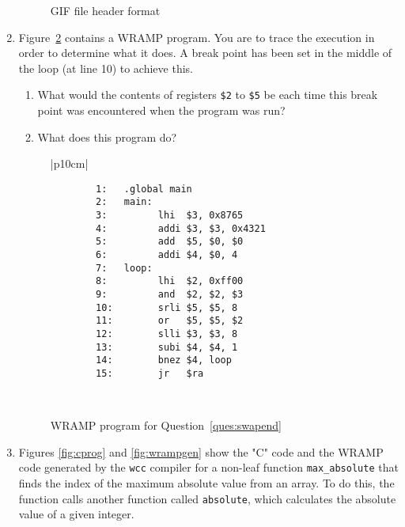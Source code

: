 \documentclass[a4paper,10pt]{article}
\begin{document}
\begin{enumerate}
\begin{figure}[h]
  \begin{center}
  \caption{GIF file header format}
  \label{fig:gifheader}
  \end{center}
\end{figure}

\item
\label{ques:swapend}

Figure~\ref{fig:swapend} contains a WRAMP program. You are to trace
the execution in order to determine what it does.  A break point has
been set in the middle of the loop (at line 10) to achieve this.

\begin{enumerate} 
\item What would the contents of registers \texttt{\$2} to \texttt{\$5} be each time this
break point was encountered when the program was run?
\item What does this program do?
\end{enumerate}

\begin{figure}[h]
\begin{footnotesize}
\begin{center}
\begin{tabular}{|p{10cm}|}
\hline
\begin{verbatim}
        1:   .global main
        2:   main:
        3:         lhi  $3, 0x8765
        4:         addi $3, $3, 0x4321
        5:         add  $5, $0, $0
        6:         addi $4, $0, 4
        7:   loop:    
        8:         lhi  $2, 0xff00
        9:         and  $2, $2, $3
        10:        srli $5, $5, 8
        11:        or   $5, $5, $2
        12:        slli $3, $3, 8
        13:        subi $4, $4, 1
        14:        bnez $4, loop
        15:        jr   $ra
\end{verbatim}
\\
\hline
\end{tabular}
\end{center}
\end{footnotesize}
\caption{WRAMP program for Question~\ref{ques:swapend}}
\label{fig:swapend}
\end{figure}

\newpage
\item 
\label{ques:cprog}
Figures \ref{fig:cprog} and \ref{fig:wrampgen} show the "C" code and
the WRAMP code generated by the \texttt{wcc} compiler for a non-leaf
function \verb+max_absolute+ that finds the index of the maximum absolute
value from an array. To do this, the function calls another function called
\verb+absolute+, which calculates the absolute value of a given integer.


\end{enumerate}
\end{document}
